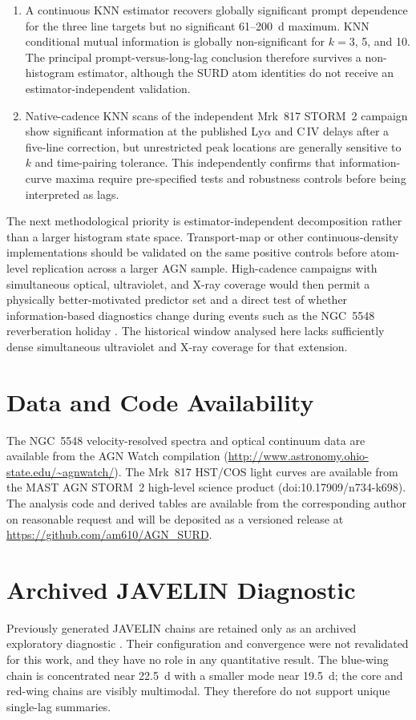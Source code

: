 \documentclass[fleqn,usenatbib]{mnras}
\begin{document}
\begin{enumerate}
\item A continuous KNN estimator recovers globally significant prompt dependence for the three line targets but no significant 61--200~d maximum. KNN conditional mutual information is globally non-significant for $k=3$, 5, and 10. The principal prompt-versus-long-lag conclusion therefore survives a non-histogram estimator, although the SURD atom identities do not receive an estimator-independent validation.
\item Native-cadence KNN scans of the independent Mrk~817 STORM~2 campaign show significant information at the published Ly$\alpha$ and C\,IV delays after a five-line correction, but unrestricted peak locations are generally sensitive to $k$ and time-pairing tolerance. This independently confirms that information-curve maxima require pre-specified tests and robustness controls before being interpreted as lags.
\end{enumerate}

The next methodological priority is estimator-independent decomposition rather than a larger histogram state space. Transport-map or other continuous-density implementations should be validated on the same positive controls before atom-level replication across a larger AGN sample. High-cadence campaigns with simultaneous optical, ultraviolet, and X-ray coverage would then permit a physically better-motivated predictor set and a direct test of whether information-based diagnostics change during events such as the NGC~5548 reverberation holiday \citep{Dehghanian2019}. The historical window analysed here lacks sufficiently dense simultaneous ultraviolet and X-ray coverage for that extension.

\section*{Data and Code Availability}
The NGC~5548 velocity-resolved spectra and optical continuum data are available from the AGN Watch compilation (\url{http://www.astronomy.ohio-state.edu/~agnwatch/}). The Mrk~817 HST/COS light curves are available from the MAST AGN STORM~2 high-level science product (doi:10.17909/n734-k698). The analysis code and derived tables are available from the corresponding author on reasonable request and will be deposited as a versioned release at \url{https://github.com/am610/AGN_SURD}.

\appendix
\section{Archived JAVELIN Diagnostic}
\label{app:javelin}
Previously generated JAVELIN chains are retained only as an archived exploratory diagnostic \citep{Zu2011}. Their configuration and convergence were not revalidated for this work, and they have no role in any quantitative result. The blue-wing chain is concentrated near 22.5~d with a smaller mode near 19.5~d; the core and red-wing chains are visibly multimodal. They therefore do not support unique single-lag summaries.
\end{document}
